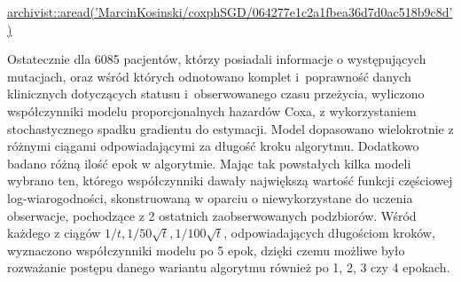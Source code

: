 \href{https://github.com/MarcinKosinski/coxphSGD/blob/master/gallery/064277e1c2a1fbea36d7d0ac518b9c8d.rda?raw=true}{archivist::aread('MarcinKosinski/coxphSGD/064277e1c2a1fbea36d7d0ac518b9c8d')}

Ostatecznie dla 6085 pacjentów, którzy posiadali informacje o
występujących mutacjach, oraz wśród których odnotowano komplet i~poprawność danych klinicznych dotyczących statusu i~obserwowanego czasu
przeżycia, wyliczono współczynniki modelu proporcjonalnych hazardów Coxa,
z wykorzystaniem stochastycznego spadku gradientu do estymacji. Model
dopasowano wielokrotnie z różnymi ciągami odpowiadającymi za długość
kroku algorytmu. Dodatkowo badano różną ilość epok w algorytmie. Mając tak
powstałych kilka modeli wybrano ten, którego współczynniki
dawały największą wartość funkcji częściowej log-wiarogodności, skonstruowaną w oparciu o 
niewykorzystane do uczenia obserwacje, pochodzące z 2 ostatnich
zaobserwowanych podzbiorów. Wśród każdego z ciągów
\(1/t, 1/50\sqrt{t}, 1/100\sqrt{t}\), odpowiadających długościom
kroków, wyznaczono współczynniki modelu po 5 epok, dzięki
czemu możliwe było rozważanie postępu danego wariantu algorytmu również
po 1, 2, 3 czy 4 epokach.

\begin{Shaded}
\begin{Highlighting}[]
\NormalTok{coxData_split[}\NormalTok{:}\NormalTok{] ->}\StringTok{ }
\NormalTok{coxData_split[}\NormalTok{:}\NormalTok{] ->}\StringTok{ }
  \NormalTok{) ->}\StringTok{ }
  \NormalTok{,}
          \NormalTok{/(}\NormalTok{*}\StringTok{ }
  \NormalTok{,}
          \NormalTok{/(}\NormalTok{*}\StringTok{ }
\end{Highlighting}
\end{Shaded}

